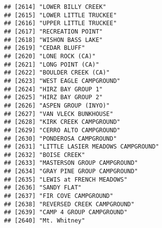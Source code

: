 \documentclass[
]{article}
\begin{document}
\begin{verbatim}
## [2614] "LOWER BILLY CREEK"                                                                   
## [2615] "LOWER LITTLE TRUCKEE"                                                                
## [2616] "UPPER LITTLE TRUCKEE"                                                                
## [2617] "RECREATION POINT"                                                                    
## [2618] "WISHON BASS LAKE"                                                                    
## [2619] "CEDAR BLUFF"                                                                         
## [2620] "LONE ROCK (CA)"                                                                      
## [2621] "LONG POINT (CA)"                                                                     
## [2622] "BOULDER CREEK (CA)"                                                                  
## [2623] "WEST EAGLE CAMPGROUND"                                                               
## [2624] "HIRZ BAY GROUP 1"                                                                    
## [2625] "HIRZ BAY GROUP 2"                                                                    
## [2626] "ASPEN GROUP (INYO)"                                                                  
## [2627] "VAN VLECK BUNKHOUSE"                                                                 
## [2628] "KIRK CREEK CAMPGROUND"                                                               
## [2629] "CERRO ALTO CAMPGROUND"                                                               
## [2630] "PONDEROSA CAMPGROUND"                                                                
## [2631] "LITTLE LASIER MEADOWS CAMPGROUND"                                                    
## [2632] "BOISE CREEK"                                                                         
## [2633] "MASTERSON GROUP CAMPGROUND"                                                          
## [2634] "GRAY PINE GROUP CAMPGROUND"                                                          
## [2635] "LEWIS at FRENCH MEADOWS"                                                             
## [2636] "SANDY FLAT"                                                                          
## [2637] "FIR COVE CAMPGROUND"                                                                 
## [2638] "REVERSED CREEK CAMPGROUND"                                                           
## [2639] "CAMP 4 GROUP CAMPGROUND"                                                             
## [2640] "Mt. Whitney"                                                                         

\end{verbatim}
\end{document}
